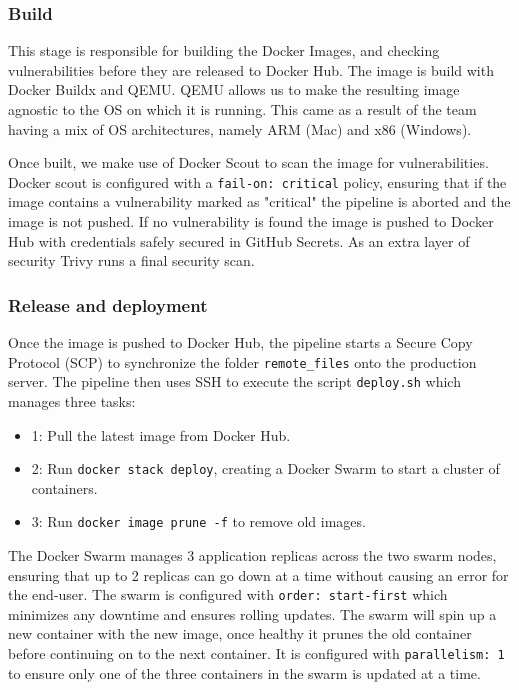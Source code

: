 \subsubsection{Build}
This stage is responsible for building the Docker Images, and checking vulnerabilities before they are released to Docker Hub. The image is build with Docker Buildx and QEMU. QEMU allows us to make the resulting image agnostic to the OS on which it is running. This came as a result of the team having a mix of OS architectures, namely ARM (Mac) and x86 (Windows). \newline


\noindent Once built, we make use of Docker Scout to scan the image for vulnerabilities. Docker scout is configured with a \texttt{fail-on: critical} policy, ensuring that if the image contains a vulnerability marked as "critical" the pipeline is aborted and the image is not pushed. If no vulnerability is found the image is pushed to Docker Hub with credentials safely secured in GitHub Secrets. As an extra layer of security Trivy runs a final security scan.\newline


\subsubsection{Release and deployment}
Once the image is pushed to Docker Hub, the pipeline starts a Secure Copy Protocol (SCP) to synchronize the folder \texttt{remote\_files} onto the production server. The pipeline then uses SSH to execute the script \texttt{deploy.sh} which manages three tasks:
\begin{itemize}
    \item 1: Pull the latest image from Docker Hub.
    \item 2: Run \texttt{docker stack deploy}, creating a Docker Swarm to start a cluster of containers.
    \item 3: Run \texttt{docker image prune -f} to remove old images.
\end{itemize}
\noindent The Docker Swarm manages 3 application replicas across the two swarm nodes, ensuring that up to 2 replicas can go down at a time without causing an error for the end-user. The swarm is configured with \texttt{order: start-first} which minimizes any downtime and ensures rolling updates. The swarm will spin up a new container with the new image, once healthy  it prunes the old container before continuing on to the next container. It is configured with \texttt{parallelism: 1} to ensure only one of the three containers in the swarm is updated at a time.

